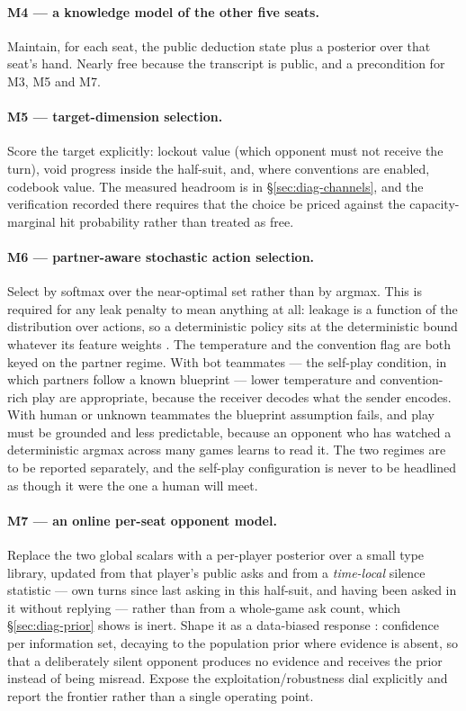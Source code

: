 \documentclass[11pt]{article}
\theoremstyle{definition}
\begin{document}
\paragraph{M4 --- a knowledge model of the other five seats.} Maintain, for each
seat, the public deduction state plus a posterior over that seat's hand. Nearly
free because the transcript is public, and a precondition for M3, M5 and M7.

\paragraph{M5 --- target-dimension selection.} Score the target explicitly:
lockout value (which opponent must not receive the turn), void progress inside
the half-suit, and, where conventions are enabled, codebook value. The measured
headroom is in \S\ref{sec:diag-channels}, and the verification recorded there
requires that the choice be priced against the capacity-marginal hit probability
rather than treated as free.

\paragraph{M6 --- partner-aware stochastic action selection.}
\label{sec:mech-partner}
Select by softmax over the near-optimal set rather than by argmax. This is
required for any leak penalty to mean anything at all: leakage is a function of
the distribution over actions, so a deterministic policy sits at the
deterministic bound whatever its feature weights \cite{alvim-leakage}. The
temperature and the convention flag are both keyed on the partner regime. With
bot teammates --- the self-play condition, in which partners follow a known
blueprint --- lower temperature and convention-rich play are appropriate, because
the receiver decodes what the sender encodes. With human or unknown teammates the
blueprint assumption fails, and play must be grounded and less predictable,
because an opponent who has watched a deterministic argmax across many games
learns to read it. The two regimes are to be reported separately, and the
self-play configuration is never to be headlined as though it were the one a
human will meet.

\paragraph{M7 --- an online per-seat opponent model.} Replace the two global
scalars with a per-player posterior over a small type library, updated from that
player's public asks and from a \emph{time-local} silence statistic --- own turns
since last asking in this half-suit, and having been asked in it without
replying --- rather than from a whole-game ask count, which
\S\ref{sec:diag-prior} shows is inert. Shape it as a data-biased response
\cite{johanson-dbr}: confidence per information set, decaying to the population
prior where evidence is absent, so that a deliberately silent opponent produces
no evidence and receives the prior instead of being misread. Expose the
exploitation/robustness dial explicitly and report the frontier
\cite{johanson-rnash} rather than a single operating point.
\end{document}

